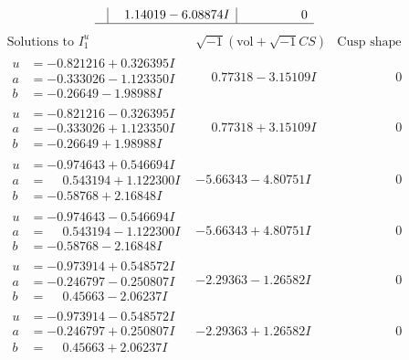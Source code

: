 \documentclass[1p]{elsarticle_modified}
\theoremstyle{definition}
\newcommand{\I}{\sqrt{-1}}
\begin{document}
$$\begin{array}{c|c|c}
 & \phantom{-}1.14019 - 6.08874 I & \phantom{-0.000000 } 0\\
 \hline 
 \end{array}$$\newpage$$\begin{array}{c|c|c}  
\text{Solutions to }I^u_{1}& \I (\text{vol} + \sqrt{-1}CS) & \text{Cusp shape}\\
 \hline 
\begin{aligned}
u &= -0.821216 + 0.326395 I \\
a &= -0.333026 - 1.123350 I \\
b &= -0.26649 - 1.98988 I\end{aligned}
 & \phantom{-}0.77318 - 3.15109 I & \phantom{-0.000000 } 0 \\ \hline\begin{aligned}
u &= -0.821216 - 0.326395 I \\
a &= -0.333026 + 1.123350 I \\
b &= -0.26649 + 1.98988 I\end{aligned}
 & \phantom{-}0.77318 + 3.15109 I & \phantom{-0.000000 } 0 \\ \hline\begin{aligned}
u &= -0.974643 + 0.546694 I \\
a &= \phantom{-}0.543194 + 1.122300 I \\
b &= -0.58768 + 2.16848 I\end{aligned}
 & -5.66343 - 4.80751 I & \phantom{-0.000000 } 0 \\ \hline\begin{aligned}
u &= -0.974643 - 0.546694 I \\
a &= \phantom{-}0.543194 - 1.122300 I \\
b &= -0.58768 - 2.16848 I\end{aligned}
 & -5.66343 + 4.80751 I & \phantom{-0.000000 } 0 \\ \hline\begin{aligned}
u &= -0.973914 + 0.548572 I \\
a &= -0.246797 - 0.250807 I \\
b &= \phantom{-}0.45663 - 2.06237 I\end{aligned}
 & -2.29363 - 1.26582 I & \phantom{-0.000000 } 0 \\ \hline\begin{aligned}
u &= -0.973914 - 0.548572 I \\
a &= -0.246797 + 0.250807 I \\
b &= \phantom{-}0.45663 + 2.06237 I\end{aligned}
 & -2.29363 + 1.26582 I & \phantom{-0.000000 } 0 \\ \hline\begin{aligned}

\end{aligned}
\end{array}$$
\end{document}

